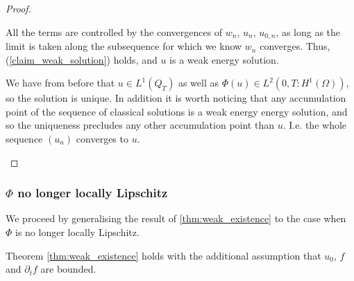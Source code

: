 \documentclass[11pt, a4paper]{article}
\begin{document}
\begin{proof}
\begin{description}
	All the terms are controlled by the convergences of $w_n$, $u_n$, $u_{0,n}$, as long as the limit is taken along the subsequence for which we know $w_n$ converges. Thus, (\ref{claim_weak_solution}) holds, and $u$ is a weak energy solution.
	
	We have from before that $u\in L^1(Q_T)$ as well as $\Phi(u) \in L^2(0,T: H^1(\Omega))$, so the solution is unique. In addition it is worth noticing that any accumulation point of the sequence of classical solutions is a weak energy energy solution, and so the uniqueness precludes any other accumulation point than $u$. I.e. the whole sequence $(u_n)$ converges to $u$.

\end{description}


\end{proof}


\subsubsection{$\Phi$ no longer locally Lipschitz}
We proceed by generalising the result of \ref{thm:weak_existence} to the case when $\Phi$ is no longer locally Lipschitz.

\begin{lemma}
\label{lem:weak_existence_part2}
Theorem \ref{thm:weak_existence} holds with the additional assumption that $u_0$, $f$ and $\partial_t f$ are bounded.
\end{lemma}
\end{document}
